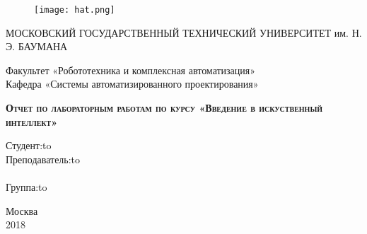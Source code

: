 \begin{titlepage}
\newpage

\begin{figure}[!htb]
\centering
\texttt{[image: hat.png]}
\end{figure}

\begin{center}
МОСКОВСКИЙ ГОСУДАРСТВЕННЫЙ ТЕХНИЧЕСКИЙ
УНИВЕРСИТЕТ им. Н. Э. БАУМАНА \\
\end{center}

\vspace{8em}

\begin{center}
\Large Факультет «Робототехника и комплексная автоматизация» \\
\Large Кафедра «Системы автоматизированного проектирования» \\ 
\end{center}

\vspace{2em}

\begin{center}
\textsc{\textbf{Отчет по лабораторным работам по курсу
 \linebreak «Введение в искуственный интеллект»}}
\end{center}

\vspace{6em}



\newbox{\lbox}
\newlength{\maxl}
\setlength{\maxl}{\wd\lbox}
\hfill\parbox{11cm}{
\hspace*{5cm}\hspace*{-5cm}Студент:\hfill\hbox to\\
\hspace*{5cm}\hspace*{-5cm}Преподаватель:\hfill\hbox to\\
\\
\hspace*{5cm}\hspace*{-5cm}Группа:\hfill\hbox to\\
}


\vspace{\fill}

\begin{center}
Москва \\2018
\end{center}

\end{titlepage}